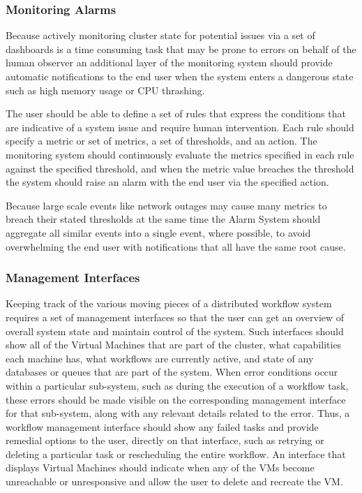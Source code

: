 \subsubsection {Monitoring Alarms}

Because actively monitoring cluster state for potential issues via a set of dashboards is a time consuming task that may be prone to errors on behalf of the human observer an additional layer of the monitoring system should provide automatic notifications to the end user when the system enters a dangerous state such as high memory usage or CPU thrashing.

The user should be able to define a set of rules that express the conditions that are indicative of a system issue and require human intervention. Each rule should specify a metric or set of metrics, a set of thresholds, and an action. The monitoring system should continuously evaluate the metrics specified in each rule against the specified threshold, and when the metric value breaches the threshold the system should raise an alarm with the end user via the specified action. 

Because large scale events like network outages may cause many metrics to breach their stated thresholds at the same time the Alarm System should aggregate all similar events into a single event, where possible, to avoid overwhelming the end user with notifications that all have the same root cause.

\subsubsection {Management Interfaces}

Keeping track of the various moving pieces of a distributed workflow system requires a set of management interfaces so that the user can get an overview of overall system state and maintain control of the system. Such interfaces should show all of the Virtual Machines that are part of the cluster, what capabilities each machine has, what workflows are currently active, and state of any databases or queues that are part of the system. When error conditions occur within a particular sub-system, such as during the execution of a workflow task, these errors should be made visible on the corresponding management interface for that sub-system, along with any relevant details related to the error. Thus, a workflow management interface should show any failed tasks and provide remedial options to the user, directly on that interface, such as retrying or deleting a particular task or rescheduling the entire workflow. An interface that displays Virtual Machines should indicate when any of the VMs become unreachable or unresponsive and allow the user to delete and recreate the VM.

